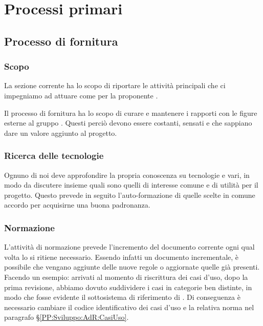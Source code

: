 \section{Processi primari}\label{ProcessiPrimari}

    \subsection{Processo di fornitura}\label{PP:Fornitura}	%

        \subsubsection{Scopo}\label{PP:Fornitura:Scopo}
		La sezione corrente ha lo scopo di riportare le attività principali che ci impegniamo ad attuare come  per la proponente \II. \par
        Il processo di fornitura ha lo scopo di curare e mantenere i rapporti con le figure esterne al gruppo \gruppo. Questi perciò devono essere costanti, sensati e che sappiano dare un valore aggiunto al progetto.

		\subsubsection{Ricerca delle tecnologie}
		Ognuno di noi deve approfondire la propria conoscenza su tecnologie e  vari, in modo da discutere insieme quali sono quelli di interesse comune e di utilità per il progetto. Questo prevede in seguito l'auto-formazione di quelle scelte in comune accordo per acquisirne una buona padronanza.

		\subsubsection{Normazione}\label{Normazione}
		L'attività di normazione prevede l'incremento del documento corrente ogni qual volta lo si ritiene necessario.
		Essendo infatti un documento incrementale, è possibile che vengano aggiunte delle nuove regole o aggiornate quelle già presenti.
		Facendo un esempio: arrivati al momento di riscrittura dei casi d'uso, dopo la prima revisione, abbiamo dovuto suddividere i casi in categorie ben distinte, in modo che fosse evidente il sottosistema di riferimento di \progetto.
		Di conseguenza è necessario cambiare il codice identificativo dei casi d'uso e la relativa norma nel paragrafo \S\ref{PP:Sviluppo:AdR:CasiUso}.
        

